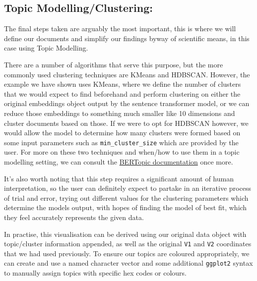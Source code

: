 \documentclass[
  letterpaper,
  DIV=11,
  numbers=noendperiod]{scrreprt}
\begin{document}
\subsection{Topic
Modelling/Clustering:}\label{topic-modellingclustering}

The final steps taken are arguably the most important, this is where we
will define our documents and simplify our findings byway of scientific
means, in this case using Topic Modelling.

There are a number of algorithms that serve this purpose, but the more
commonly used clustering techniques are KMeans and HDBSCAN. However, the
example we have shown uses KMeans, where we define the number of
clusters that we would expect to find beforehand and perform clustering
on either the original embeddings object output by the sentence
transformer model, or we can reduce those embeddings to something much
smaller like 10 dimensions and cluster documents based on those. If we
were to opt for HDBSCAN however, we would allow the model to determine
how many clusters were formed based on some input parameters such as
\texttt{min\_cluster\_size} which are provided by the user. For more on
these two techniques and when/how to use them in a topic modelling
setting, we can consult the
\href{https://maartengr.github.io/BERTopic/getting_started/clustering/clustering.html\#hdbscan}{BERTopic
documentation} once more.

It's also worth noting that this step requires a significant amount of
human interpretation, so the user can definitely expect to partake in an
iterative process of trial and error, trying out different values for
the clustering parameters which determine the models output, with hopes
of finding the model of best fit, which they feel accurately represents
the given data.

In practise, this visualisation can be derived using our original data
object with topic/cluster information appended, as well as the original
\texttt{V1} and \texttt{V2} coordinates that we had used previously. To
ensure our topics are coloured appropriately, we can create and use a
named character vector and some additional \texttt{ggplot2} syntax to
manually assign topics with specific hex codes or colours.
\end{document}
